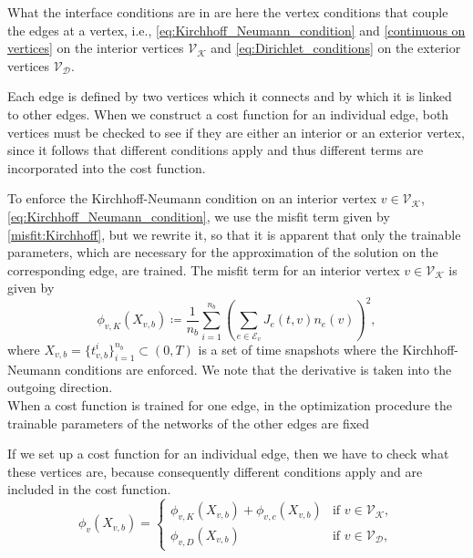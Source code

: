 What the interface conditions are in \cite{JagtapKharazmiKarniadakis:2020} are here the vertex conditions that couple the edges at a vertex, i.e., \cref{eq:Kirchhoff_Neumann_condition} and \cref{continuous on vertices} on the interior vertices $\mathcal{V}_\mathcal{K}$ and \cref{eq:Dirichlet_conditions} on the exterior vertices $\mathcal{V}_\mathcal{D}$. 

Each edge is defined by two vertices which it connects and by which it is linked to other edges. When we construct a cost function for an individual edge, both vertices must be checked to see if they are either an interior or an exterior vertex, since it follows that different conditions apply and thus different terms are incorporated into the cost function. 

To enforce the Kirchhoff-Neumann condition on an interior vertex $v \in \mathcal{V}_\mathcal{K}$, \cref{eq:Kirchhoff_Neumann_condition}, we use the misfit term given by \cref{misfit:Kirchhoff}, but we rewrite it, so that it is apparent that only the trainable parameters, which are necessary for the approximation of the solution on the corresponding edge, are trained. The misfit term for an interior vertex $v \in \mathcal{V}_\mathcal{K}$ is given by
\begin{equation} 
    \label{misfit:Kirchhoff.}
    \phi_{v,K}  \left( X_{v,b} \right) \coloneqq \frac{1}{n_b} \sum_{i=1}^{n_b}  \left( \sum_{e\in \mathcal{E}_v} J_e(t,v) n_e (v) \right)^2, 
\end{equation} 
where $X_{v,b} = \{t_{v,b}^i\}_{i=1}^{n_b} \subset \left( 0,T \right)$ is a set of time snapshots where the Kirchhoff-Neumann conditions are enforced. We note that the derivative is taken into the outgoing direction. \\

When a cost function is trained for one edge, in the optimization procedure the trainable parameters of the networks of the other edges are fixed



If we set up a cost function for an individual edge, then we have to check what these vertices are, because consequently different conditions apply and are included in the cost function. 
\begin{equation}
    \label{vertex funcions}
    \phi_{v}(X_{v,b}) = \begin{cases} \phi_{v,K}  \left( X_{v,b} \right) +  \phi_{v,c}  \left( X_{v,b} \right)& \text{if } v \in \mathcal{V}_{\mathcal{K}}, \\ \phi_{v,D}  \left( X_{v,b} \right) & \text{if } v \in \mathcal{V}_{\mathcal{D}}, \end{cases}
\end{equation}


